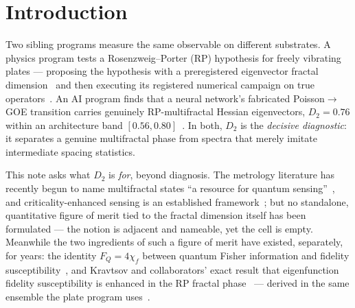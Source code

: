 \documentclass[11pt]{article}
\newcommand{\rmean}{\langle r\rangle}
\newcommand{\chif}{\chi_{f}}
\begin{document}
\begin{abstract}
coexistence test on the interacting $t$--$V$ chain finds a textbook ergodic$\to$localized crossover
($\rmean$: $0.532\to0.386$) whose \emph{typical} susceptibility peaks at the crossover's ergodic
edge --- not mid-crossover --- with the predicted heavy $x^{-2}$ tail (Hill index $1.96$--$2.04$)
in the chaotic regime and estimator-dependent rare-event gains inside the crossover. The platform
statement is scoped accordingly, and one instrument caveat is stated up front: this attaches to
\emph{lattice/Bloch} gravimetry, not to free-fall light-pulse interferometry. Tier-2 throughout:
a shared random-matrix description with preregistered numerical evidence, not a hardware claim.
\end{abstract}

\section{Introduction}

Two sibling programs measure the same observable on different substrates. A physics program tests a
Rosenzweig--Porter (RP) hypothesis for freely vibrating plates --- proposing the hypothesis with a
preregistered eigenvector fractal dimension~\cite{ornelas2026hyp} and then executing its registered
numerical campaign on true operators~\cite{ornelas2026fem}. An AI program finds that a neural
network's fabricated Poisson$\to$GOE transition carries genuinely RP-multifractal Hessian
eigenvectors, $D_2 = 0.76$ within an architecture band $[0.56,0.80]$~\cite{ornelas2026rmt}. In both,
$D_2$ is the \emph{decisive diagnostic}: it separates a genuine multifractal phase from spectra that
merely imitate intermediate spacing statistics.

This note asks what $D_2$ is \emph{for}, beyond diagnosis. The metrology literature has recently
begun to name multifractal states ``a resource for quantum sensing''~\cite{hu2026}, and
criticality-enhanced sensing is an established framework~\cite{sahoo2024,liu2024me}; but no
standalone, quantitative figure of merit tied to the fractal dimension itself has been formulated
--- the notion is adjacent and nameable, yet the cell is empty. Meanwhile the two ingredients of
such a figure of merit have existed, separately, for years: the identity $F_Q = 4\chif$ between
quantum Fisher information and fidelity susceptibility~\cite{liu2014,safranek2017,hauke2016}, and
Kravtsov and collaborators' exact result that eigenfunction fidelity susceptibility is enhanced in
the RP fractal phase~\cite{sak2022} --- derived in the same ensemble the plate program
uses~\cite{kravtsov2015}.
\end{document}
